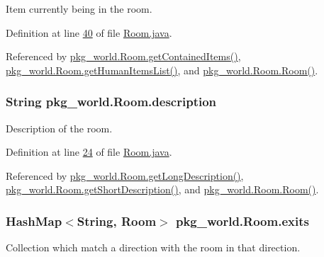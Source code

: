 Item currently being in the room. 



Definition at line \hyperlink{Room_8java_source_l00040}{40} of file \hyperlink{Room_8java_source}{Room.\-java}.



Referenced by \hyperlink{Room_8java_source_l00083}{pkg\-\_\-world.\-Room.\-get\-Contained\-Items()}, \hyperlink{Room_8java_source_l00171}{pkg\-\_\-world.\-Room.\-get\-Human\-Items\-List()}, and \hyperlink{Room_8java_source_l00062}{pkg\-\_\-world.\-Room.\-Room()}.

\hypertarget{classpkg__world_1_1Room_a029ab15b9217139d350f3a6980e49a93}{
\subsubsection[{description}]{\setlength{\rightskip}{0pt plus 5cm}String pkg\-\_\-world.\-Room.\-description\hspace{0.3cm}{\ttfamily [private]}}}\label{classpkg__world_1_1Room_a029ab15b9217139d350f3a6980e49a93}


Description of the room. 



Definition at line \hyperlink{Room_8java_source_l00024}{24} of file \hyperlink{Room_8java_source}{Room.\-java}.



Referenced by \hyperlink{Room_8java_source_l00160}{pkg\-\_\-world.\-Room.\-get\-Long\-Description()}, \hyperlink{Room_8java_source_l00151}{pkg\-\_\-world.\-Room.\-get\-Short\-Description()}, and \hyperlink{Room_8java_source_l00052}{pkg\-\_\-world.\-Room.\-Room()}.

\hypertarget{classpkg__world_1_1Room_a7ddc883b0f176f4e8a866dfb4af66167}{
\subsubsection[{exits}]{\setlength{\rightskip}{0pt plus 5cm}Hash\-Map$<$String, {\bf Room}$>$ pkg\-\_\-world.\-Room.\-exits\hspace{0.3cm}{\ttfamily [private]}}}\label{classpkg__world_1_1Room_a7ddc883b0f176f4e8a866dfb4af66167}


Collection which match a direction with the room in that direction. 



